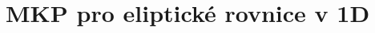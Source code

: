 % 
% 
% 
% 
% 
% 
\hypertarget{sec:diff_eq}{%
\section{MKP pro eliptické rovnice v 1D}
\label{sec:diff_eq}}

% 
% 

